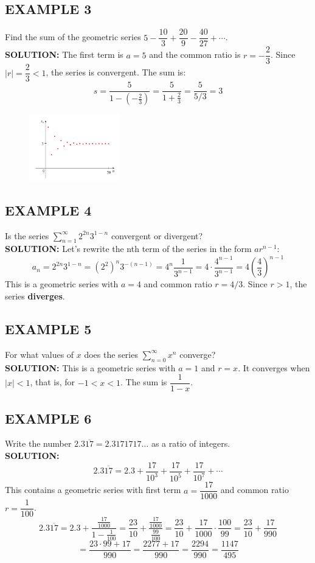 \documentclass{article}
\theoremstyle{mystyle}
\begin{document}
\subsection*{EXAMPLE 3}
Find the sum of the geometric series \( 5 - \dfrac{10}{3} + \dfrac{20}{9} - \dfrac{40}{27} + \cdots \).\\
\textbf{SOLUTION:}
The first term is \(a = 5\) and the common ratio is \(r = -\dfrac{2}{3}\). Since \(|r| = \dfrac{2}{3} < 1\), the series is convergent. The sum is:
\[ s = \dfrac{5}{1 - (-\frac{2}{3})} = \dfrac{5}{1 + \frac{2}{3}} = \dfrac{5}{5/3} = 3 \]
\begin{figure}[htbp]
    \centering
    \includegraphics[width=0.35\textwidth]{graph72.png}
\end{figure}

\subsection*{EXAMPLE 4}
Is the series \( \sum_{n=1}^{\infty} 2^{2n} 3^{1-n} \) convergent or divergent?\\
\textbf{SOLUTION:}
Let's rewrite the nth term of the series in the form \(ar^{n-1}\):
\[ a_n = 2^{2n} 3^{1-n} = (2^2)^n 3^{-(n-1)} = 4^n \dfrac{1}{3^{n-1}} = 4 \cdot \dfrac{4^{n-1}}{3^{n-1}} = 4 \left( \dfrac{4}{3} \right)^{n-1} \]
This is a geometric series with \(a=4\) and common ratio \(r = 4/3\). Since \(r > 1\), the series \textbf{diverges}.

\subsection*{EXAMPLE 5}
For what values of \(x\) does the series \( \sum_{n=0}^{\infty} x^n \) converge?\\
\textbf{SOLUTION:}
This is a geometric series with \(a=1\) and \(r=x\). It converges when \(|x|<1\), that is, for \(-1 < x < 1\). The sum is \(\dfrac{1}{1-x}\).

\subsection*{EXAMPLE 6}
Write the number \(2.3\overline{17} = 2.3171717\dots\) as a ratio of integers.\\
\textbf{SOLUTION:}
\[ 2.3\overline{17} = 2.3 + \dfrac{17}{10^3} + \dfrac{17}{10^5} + \dfrac{17}{10^7} + \cdots \]
This contains a geometric series with first term \(a = \dfrac{17}{1000}\) and common ratio \(r = \dfrac{1}{100}\).
\[ 2.3\overline{17} = 2.3 + \dfrac{\frac{17}{1000}}{1 - \frac{1}{100}} = \dfrac{23}{10} + \dfrac{\frac{17}{1000}}{\frac{99}{100}} = \dfrac{23}{10} + \dfrac{17}{1000} \cdot \dfrac{100}{99} = \dfrac{23}{10} + \dfrac{17}{990} \]
\[ = \dfrac{23 \cdot 99 + 17}{990} = \dfrac{2277 + 17}{990} = \dfrac{2294}{990} = \dfrac{1147}{495} \]
\end{document}
